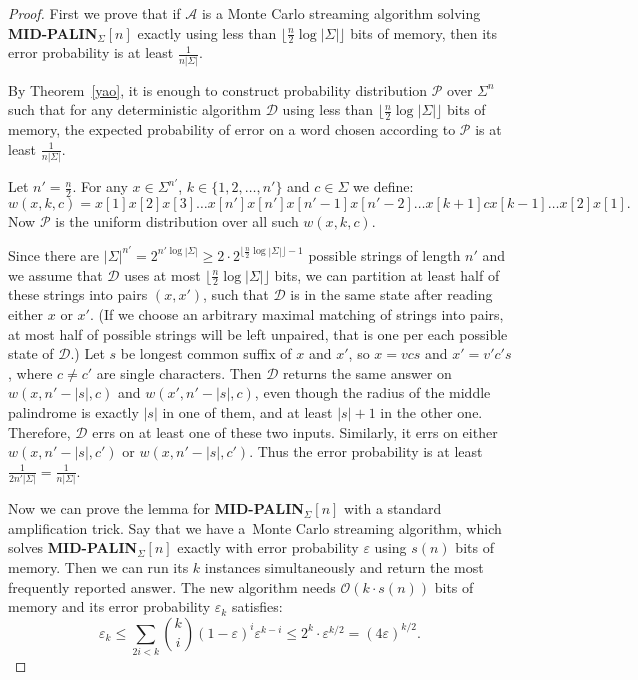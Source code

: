 \documentclass{article}[11pt,letter]
\newcommand{\bigo}{\mathcal{O}}
\newcommand{\alg}{\mathcal{A}}
\newcommand{\dalg}{\mathcal{D}}
\newcommand{\midpalin}[1][n]{{\bf MID-PALIN}$_{\Sigma}[#1]$\xspace}
\begin{document}
\begin{proof}
First we prove that if $\alg$ is a Monte Carlo streaming algorithm solving \midpalin exactly using less than $\lfloor\frac{n}{2} \log |\Sigma| \rfloor$ bits
of memory, then its error probability is at least $\frac{1}{n|\Sigma|}$.

By Theorem~\ref{yao}, it is enough to construct probability distribution $\mathcal{P}$ over $\Sigma^n$ such that for any deterministic
algorithm $\dalg$ using less than $\lfloor\frac{n}{2} \log |\Sigma| \rfloor$ bits of memory, the expected probability of error on a word chosen
according to $\mathcal{P}$ is at least $\frac{1}{n|\Sigma|}$.

Let $n' = \frac{n}{2}$. For any $x\in\Sigma^{n'}$, $k\in\{1,2,\ldots,n'\}$ and $c\in\Sigma$ we define:
\[w(x,k,c) = x[1] x[2] x[3]  \ldots x[n'] x[n'] x[n'-1] x[n'-2] \ldots  x[k+1]  c  x[k-1] \ldots x[2]x[1].\]
Now $\mathcal{P}$ is the uniform distribution over all such $w(x,k,c)$.

Since there are $|\Sigma|^{n'}=2^{n' \log |\Sigma|} \ge 2\cdot 2^{\lfloor\frac{n}{2} \log |\Sigma| \rfloor-1}$ possible strings of length $n'$ and we assume that
$\dalg$ uses at most $\lfloor\frac{n}{2} \log |\Sigma| \rfloor$ bits,
we can 
partition at least half of these strings into pairs $(x,x')$, such that $\dalg$ is in the same state after reading either $x$ or $x'$. (If we choose an arbitrary maximal
matching of strings into pairs, at most half of possible strings will be left unpaired, that is one per each possible state of $\dalg$.)
Let $s$ be longest common suffix of $x$ and $x'$, so $x = v c s$ and $x' = v' c' s$, where $c \not= c'$ are single characters.  Then
$\dalg$ returns the same answer on $w(x,n'-|s|,c)$ and $w(x',n'-|s|,c)$, even though the radius of the middle palindrome is exactly $|s|$ in one of
them, and at least $|s|+1$ in the other one. Therefore, $\dalg$ errs on at least one of these two inputs. Similarly, it errs on either
$w(x,n'-|s|,c')$ or $w(x,n'-|s|,c')$. Thus the error probability is at least $\frac{1}{2n'|\Sigma|} = \frac1{n|\Sigma|}$. 

Now we can prove the lemma for \midpalin with a standard amplification trick.
Say that we have a~Monte Carlo streaming algorithm, which solves \midpalin exactly
with error probability $\varepsilon$ using $s(n)$ bits of memory. Then we can run its $k$ instances simultaneously and return
the most frequently reported answer. The new algorithm needs $\bigo(k\cdot s(n))$ bits of memory and its error probability $\varepsilon_{k}$ satisfies:
\[\varepsilon_k \le \sum_{2i < k} \binom{k}{i}(1-\varepsilon)^i \varepsilon^{k-i} \le 2^k \cdot \varepsilon^{k/2} = (4 \varepsilon)^{k/2}.\]


\end{proof}
\end{document}
